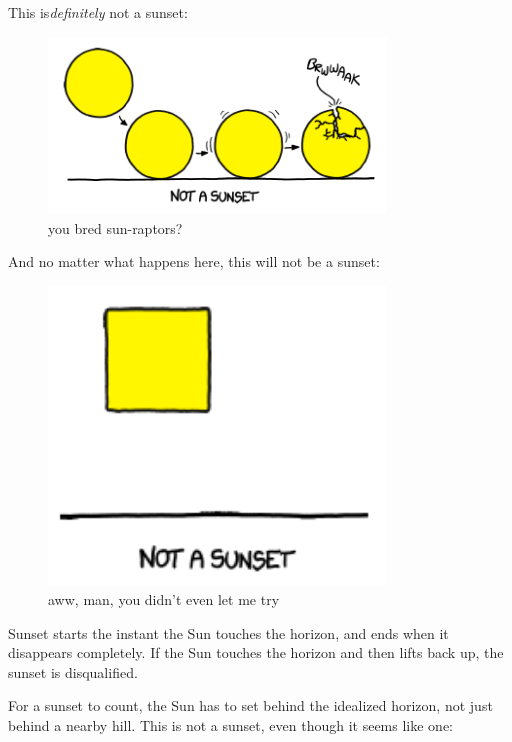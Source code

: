 {This is\emph{definitely} not a sunset:}

\begin{figure}[!htbp]
\centering
\includegraphics[scale=0.5, max width=0.8\textwidth]{imgs/a/42/sunset_not_egg.png}
\caption{you bred sun-raptors?}
\end{figure}

{And no matter what happens here, this will not be a sunset:}

\begin{figure}[!htbp]
\centering
\includegraphics[scale=0.5, max width=0.8\textwidth]{imgs/a/42/sunset_not_square.png}
\caption{aww, man, you didn’t even let me try}
\end{figure}

{Sunset starts the instant the Sun touches the horizon, and ends when it disappears completely. If the Sun touches the horizon and then lifts back up, the sunset is disqualified.}

{For a sunset to count, the Sun has to set behind the idealized horizon, not just behind a nearby hill. This is not a sunset, even though it seems like one:}

